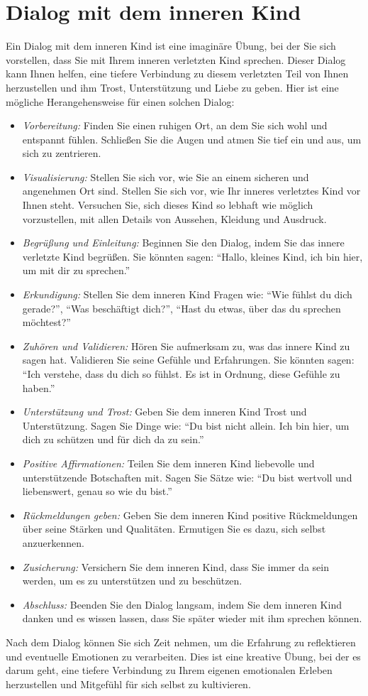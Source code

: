 \section{Dialog mit dem inneren Kind}

Ein Dialog mit dem inneren Kind ist eine imaginäre Übung, bei der Sie sich vorstellen, dass Sie mit Ihrem inneren verletzten Kind sprechen. Dieser Dialog kann Ihnen helfen, eine tiefere Verbindung zu diesem verletzten Teil von Ihnen herzustellen und ihm Trost, Unterstützung und Liebe zu geben. Hier ist eine mögliche Herangehensweise für einen solchen Dialog:
\begin{itemize}
    
    \item \emph{Vorbereitung:} Finden Sie einen ruhigen Ort, an dem Sie sich wohl und entspannt fühlen. Schließen Sie die Augen und atmen Sie tief ein und aus, um sich zu zentrieren.
    \item \emph{Visualisierung:} Stellen Sie sich vor, wie Sie an einem sicheren und angenehmen Ort sind. Stellen Sie sich vor, wie Ihr inneres verletztes Kind vor Ihnen steht. Versuchen Sie, sich dieses Kind so lebhaft wie möglich vorzustellen, mit allen Details von Aussehen, Kleidung und Ausdruck.
    \item \emph{Begrüßung und Einleitung:} Beginnen Sie den Dialog, indem Sie das innere verletzte Kind begrüßen. Sie könnten sagen: \enquote{Hallo, kleines Kind, ich bin hier, um mit dir zu sprechen.}
    \item \emph{Erkundigung:} Stellen Sie dem inneren Kind Fragen wie: \enquote{Wie fühlst du dich gerade?}, \enquote{Was beschäftigt dich?}, \enquote{Hast du etwas, über das du sprechen möchtest?} 
    \item \emph{Zuhören und Validieren:} Hören Sie aufmerksam zu, was das innere Kind zu sagen hat. Validieren Sie seine Gefühle und Erfahrungen. Sie könnten sagen: \enquote{Ich verstehe, dass du dich so fühlst. Es ist in Ordnung, diese Gefühle zu haben.}
    \item \emph{Unterstützung und Trost:} Geben Sie dem inneren Kind Trost und Unterstützung. Sagen Sie Dinge wie: \enquote{Du bist nicht allein. Ich bin hier, um dich zu schützen und für dich da zu sein.}
    \item \emph{Positive Affirmationen:} Teilen Sie dem inneren Kind liebevolle und unterstützende Botschaften mit. Sagen Sie Sätze wie: \enquote{Du bist wertvoll und liebenswert, genau so wie du bist.}
    \item \emph{Rückmeldungen geben:} Geben Sie dem inneren Kind positive Rückmeldungen über seine Stärken und Qualitäten. Ermutigen Sie es dazu, sich selbst anzuerkennen.
    \item \emph{Zusicherung:} Versichern Sie dem inneren Kind, dass Sie immer da sein werden, um es zu unterstützen und zu beschützen.
    \item \emph{Abschluss:} Beenden Sie den Dialog langsam, indem Sie dem inneren Kind danken und es wissen lassen, dass Sie später wieder mit ihm sprechen können.
\end{itemize}
%
Nach dem Dialog können Sie sich Zeit nehmen, um die Erfahrung zu reflektieren und eventuelle Emotionen zu verarbeiten. Dies ist eine kreative Übung, bei der es darum geht, eine tiefere Verbindung zu Ihrem eigenen emotionalen Erleben herzustellen und Mitgefühl für sich selbst zu kultivieren.



